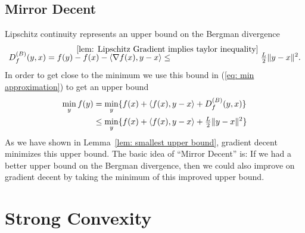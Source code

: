 \subsection{Mirror Decent}

Lipschitz continuity represents an upper bound on the Bergman divergence
\begin{align*}
	\bergmanDiv{f}(y,x)
	= f(y) - f(x) - \langle\nabla f(x), y-x\rangle
	\lxle{\ref{lem: Lipschitz Gradient implies taylor inequality}}
	\tfrac{\ubound}{2} \|y-x\|^2.
\end{align*}
In order to get close to the minimum we use this bound in
(\ref{eq: min approximation}) to get an upper bound
\begin{align*}
	\min_y f(y)
	&= \min_y \{f(x) + \langle f(x), y-x\rangle +D^{(B)}_{f}(y,x)\} \\
	&\le \min_y\{f(x) + \langle f(x), y-x\rangle +\tfrac{L}{2} \|y-x\|^2\}
\end{align*}
As we have shown in Lemma~\ref{lem: smallest upper bound}, gradient decent
minimizes this upper bound. The basic idea of ``Mirror Decent'' is: If we had a
better upper bound on the Bergman divergence, then we could also improve on
gradient decent by taking the minimum of this improved upper bound.


\section{Strong Convexity}\label{sec: Strong Convexity}

